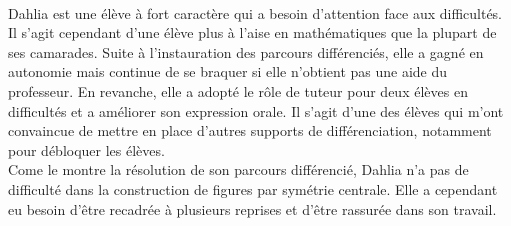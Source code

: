 \paragraph{}Dahlia est une élève à fort caractère qui a besoin d'attention face aux difficultés. Il s'agit cependant d'une élève plus à l'aise en mathématiques que la plupart de ses camarades. Suite à l'instauration des parcours différenciés, elle a gagné en autonomie mais continue de se braquer si elle n'obtient pas une aide du professeur. En revanche, elle a adopté le rôle de tuteur pour deux élèves en difficultés et a améliorer son expression orale. Il s'agit d'une des élèves qui m'ont convaincue de mettre en place d'autres supports de différenciation, notamment pour débloquer les élèves.\\
Come le montre la résolution de son parcours différencié, Dahlia n'a pas de difficulté dans la construction de figures par symétrie centrale. Elle a cependant eu besoin d'être recadrée à plusieurs reprises et d'être rassurée dans son travail.
